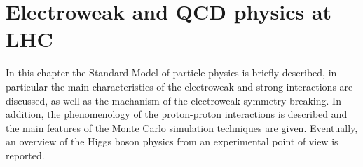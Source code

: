 \chapter{Electroweak and QCD physics at LHC}\label{chap1}
\thispagestyle{empty}

In this chapter the Standard Model of particle physics is briefly described, in particular the main characteristics of the electroweak and strong interactions are discussed, as well as the machanism of the electroweak symmetry breaking.
In addition, the phenomenology of the proton-proton interactions is described and the main features of the Monte Carlo simulation techniques are given.
Eventually, an overview of the Higgs boson physics from an experimental point of view is reported.


%





